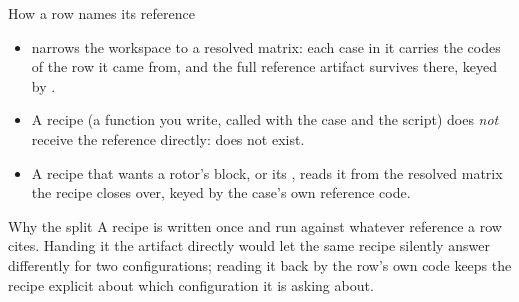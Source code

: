 \begin{frame}{How a row names its reference}
\begin{itemize}\small
  \item {} narrows the workspace to a resolved matrix:
        each case in it carries the codes of the row it came from, and the
        full reference artifact survives there, keyed by .
  \item A recipe (a function you write, called with the case and the
        script) does \emph{not} receive the reference directly:
         does not exist.
  \item A recipe that wants a rotor's block, or its , reads
        it from the resolved matrix the recipe closes over, keyed by the
        case's own reference code.
\end{itemize}
\begin{block}{Why the split}
A recipe is written once and run against whatever reference a row cites.
Handing it the artifact directly would let the same recipe silently answer
differently for two configurations; reading it back by the row's own code
keeps the recipe explicit about which configuration it is asking about.
\end{block}
\end{frame}
